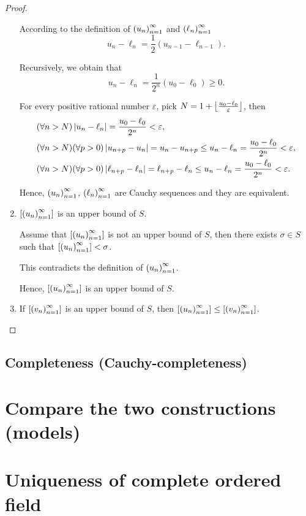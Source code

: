 \begin{proof}
\begin{enumerate}[label={\textbf{Step \arabic*.}},itemindent=1cm]
              According to the definition of ${\left({u_{n}}\right)}^{\infty}_{n=1}$ and ${\left({\ell_{n}}\right)}^{\infty}_{n=1}$
              \[
                  u_{n} - \ell_{n} = \frac{1}{2}(u_{n-1} - \ell_{n-1}).
              \]

              Recursively, we obtain that
              \[
                  u_{n} - \ell_{n} = \frac{1}{2^{n}}(u_{0} - \ell_{0})\ge 0.
              \]

              For every positive rational number $\varepsilon$, pick $N = 1 + \left\lfloor{\frac{u_{0} - \ell_{0}}{\varepsilon}}\right\rfloor$, then
              \[
                  \begin{split}
                      & (\forall n > N) \left\vert{u_{n} - \ell_{n}}\right\vert = \frac{u_{0} - \ell_{0}}{2^{n}} < \varepsilon, \\
                      & (\forall n > N)(\forall p > 0)\left\vert{u_{n+p} - u_{n}}\right\vert = u_{n} - u_{n+p}\le u_{n} - \ell_{n} = \frac{u_{0} - \ell_{0}}{2^{n}} < \varepsilon, \\
                      & (\forall n > N)(\forall p > 0)\left\vert{\ell_{n+p} - \ell_{n}}\right\vert = \ell_{n+p} - \ell_{n} \le u_{n} - \ell_{n} = \frac{u_{0} - \ell_{0}}{2^{n}} < \varepsilon.
                  \end{split}
              \]

              Hence, ${\left({u_{n}}\right)}^{\infty}_{n=1}$, ${\left({\ell_{n}}\right)}^{\infty}_{n=1}$ are Cauchy sequences and they are equivalent.
        \item $\left[{{\left({u_{n}}\right)}^{\infty}_{n=1}}\right]$ is an upper bound of $S$.

              Assume that $\left[{{\left({u_{n}}\right)}^{\infty}_{n=1}}\right]$ is not an upper bound of $S$, then there exists $\sigma\in S$ such that $\left[{{\left({u_{n}}\right)}^{\infty}_{n=1}}\right] < \sigma$.

              This contradicts the definition of ${\left({u_{n}}\right)}^{\infty}_{n=1}$.

              Hence, $\left[{{\left({u_{n}}\right)}^{\infty}_{n=1}}\right]$ is an upper bound of $S$.
        \item If $\left[{{\left({v_{n}}\right)}^{\infty}_{n=1}}\right]$ is an upper bound of $S$, then $\left[{{\left({u_{n}}\right)}^{\infty}_{n=1}}\right]\le\left[{{\left({v_{n}}\right)}^{\infty}_{n=1}}\right]$.
    \end{enumerate}
\end{proof}

\subsection{Completeness (Cauchy-completeness)}

\section{Compare the two constructions (models)}

\section{Uniqueness of complete ordered field}

